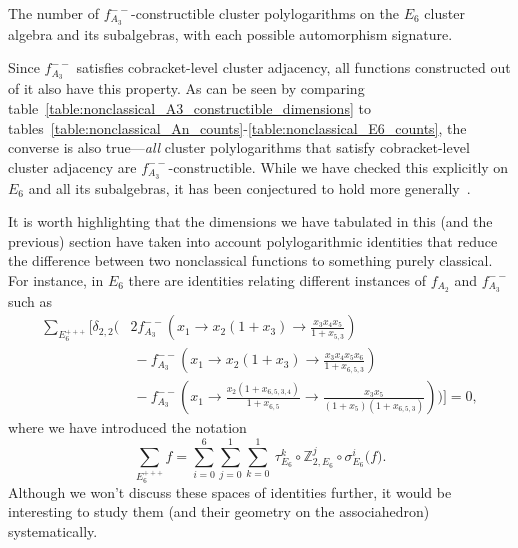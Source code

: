 \documentclass[12pt]{article}
\begin{document}
\begin{table}
\begin{center}
\end{center}

\caption{The number of $f_{A_3}^{--}$-constructible cluster polylogarithms on the $E_6$ cluster algebra and its subalgebras, with each possible automorphism signature.}
\label{table:nonclassical_A3_constructible_dimensions}
\end{table}

Since $f_{A_3}^{--}$ satisfies cobracket-level cluster adjacency, all functions constructed out of it also have this property. As can be seen by comparing table~\ref{table:nonclassical_A3_constructible_dimensions} to tables~\ref{table:nonclassical_An_counts}-\ref{table:nonclassical_E6_counts}, the converse is also true---\emph{all} cluster polylogarithms that satisfy cobracket-level cluster adjacency are $f_{A_3}^{--}$-constructible. While we have checked this explicitly on $E_6$ and all its subalgebras, it has been conjectured to hold more generally~\cite{Golden:2014xqa}. 

It is worth highlighting that the dimensions we have tabulated in this (and the previous) section have taken into account polylogarithmic identities that reduce the difference between two nonclassical functions to something purely classical. For instance, in $E_6$ there are identities relating different instances of $f_{A_2}$ and $f_{A_3}^{--}$ such as
\begin{align}
\sum_{E_6^{+++}} \Bigg[ \delta_{2,2}\Bigg(&2 f_{A_3}^{--}\left(x_1 \to x_2 (1 + x_3)\to \frac{x_3 x_4 x_5}{1 + x_{5,3}} \right)  \\
& \ - f_{A_3}^{--}\left(x_1\to x_2 (1 + x_3)\to \frac{x_3 x_4 x_5 x_6}{1 + x_{6,5,3}} \right) \nonumber  \\ 
&\ - f_{A_3}^{--}\left(x_1\to \frac{x_2 (1 + x_{6,5,3,4})}{1 + x_{6,5}}\to \frac{x_3 x_5}{(1 + x_5) (1 + x_{6,5,3})}\right)  \Bigg) \Bigg] = 0, \nonumber
\end{align}
where we have introduced the notation
\begin{equation}\label{eq:e6-symmetric-sum}
\sum_{E_6^{+++}} f = \sum_{i=0}^6\sum_{j=0}^1\sum_{k=0}^1 \ \tau_{E_6}^k \circ \mathbb{Z}_{2,E_6}^j \circ \sigma_{E_6}^i \big( f \big).
\end{equation}
Although we won't discuss these spaces of identities further, it would be interesting to study them (and their geometry on the associahedron) systematically. 
\end{document}
